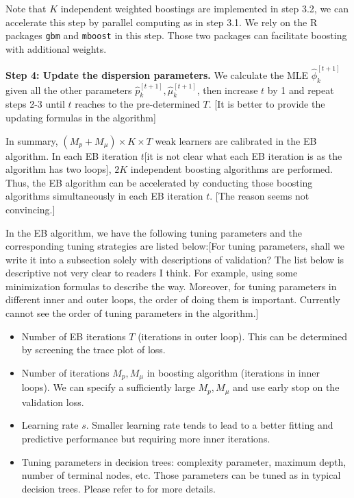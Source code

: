 \documentclass[11pt]{article}
\numberwithin{equation}{section}
\def\bx{\boldsymbol{x}}
\begin{document}
Note that $K$ independent weighted boostings are implemented in step 3.2, we can accelerate this step by parallel computing as in step 3.1.
We rely on the R packages {\tt gbm} and {\tt mboost} in this step. 
Those two packages can facilitate boosting with additional weights.

{\bf Step 4: Update the dispersion parameters.} 
We calculate the MLE $\hat{\phi}_k^{[t+1]}$ given all the other parameters $\hat{p}_k^{[t+1]}, \hat{\mu}_k^{[t+1]}$, then increase $t$ by 1 and repeat steps 2-3 until $t$ reaches to the pre-determined $T$. {\color{blue}[It is better to provide the updating formulas in the algorithm]}


In summary, $(M_p+M_\mu)\times K\times T$ weak learners  are calibrated in the EB algorithm. In each EB iteration $t${\color{blue}[it is not clear what each EB iteration is as the algorithm has two loops]}, $2K$ independent boosting algorithms are performed. Thus, the EB algorithm can be accelerated by conducting those boosting algorithms simultaneously in each EB iteration $t$. {\color{blue}[The reason seems not convincing.]}
		
In the EB algorithm, we have the following tuning parameters and the corresponding tuning strategies are listed below:{\color{blue}[For tuning parameters, shall we write it into a subsection solely with descriptions of validation? The list below is descriptive not very clear to readers I think. For example, using some minimization formulas to describe the way. Moreover, for tuning parameters in different inner and outer loops, the order of doing them is important. Currently cannot see the order of tuning parameters in the algorithm.]}
	\begin{itemize}
		\item Number of EB iterations {$T$} (iterations in outer loop). This can be determined by screening the trace plot of loss. 
		\item Number of iterations {$M_p,M_\mu$} in boosting algorithm  (iterations in inner loops). We can specify a sufficiently large $M_p,M_\mu$ and use  early stop on the validation loss.
		\item Learning rate {$s$}. Smaller learning rate tends to lead to a better fitting and predictive performance but requiring more inner iterations.
		\item Tuning parameters in decision trees: complexity parameter, maximum depth, number of terminal nodes, etc.
		Those parameters can be tuned as in typical decision trees. Please refer to \citet{hastie2009elements} for more details.
 	\end{itemize}
\end{document}
